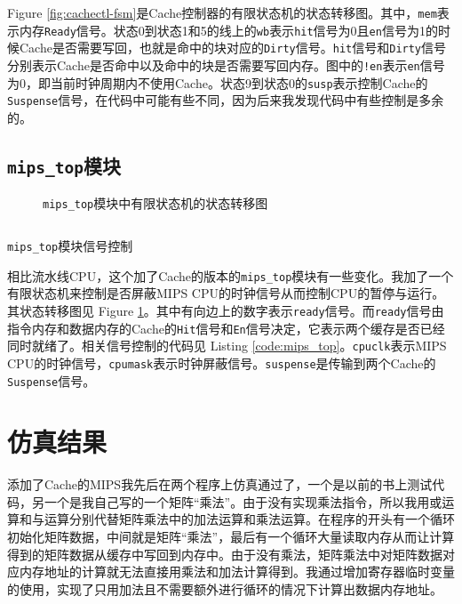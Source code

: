 \documentclass[12pt,a4paper]{article}
\newcommand{\incode}[1]{\texttt{#1}} %
\newcommand{\codefile}[1]{\inputminted[bgcolor=bg,linenos,tabsize=4]{verilog}{code/#1}} %
\begin{document}
Figure \ref{fig:cachectl-fsm}是Cache控制器的有限状态机的状态转移图。其中，\incode{mem}表示内存\incode{Ready}信号。状态0到状态1和5的线上的\incode{wb}表示\incode{hit}信号为0且\incode{en}信号为1的时候Cache是否需要写回，也就是命中的块对应的\incode{Dirty}信号。\incode{hit}信号和\incode{Dirty}信号分别表示Cache是否命中以及命中的块是否需要写回内存。图中的\incode{!en}表示\incode{en}信号为0，即当前时钟周期内不使用Cache。状态9到状态0的\incode{susp}表示控制Cache的\incode{Suspense}信号，在代码中可能有些不同，因为后来我发现代码中有些控制是多余的。

\subsection{\incode{mips_top}模块}

\begin{figure}[htb]
	\centering
	\caption{\incode{mips_top}模块中有限状态机的状态转移图}
	\label{fig:cpu-fsm}
\end{figure}

\begin{listing}[htb]
	\codefile{mips_top.v}
	\caption{\incode{mips_top}模块信号控制}
	\label{code:mips_top}
\end{listing}

相比流水线CPU，这个加了Cache的版本的\incode{mips_top}模块有一些变化。我加了一个有限状态机来控制是否屏蔽MIPS CPU的时钟信号从而控制CPU的暂停与运行。其状态转移图见 Figure \ref{fig:cpu-fsm}。其中有向边上的数字表示\incode{ready}信号。而\incode{ready}信号由指令内存和数据内存的Cache的\incode{Hit}信号和\incode{En}信号决定，它表示两个缓存是否已经同时就绪了。相关信号控制的代码见 Listing \ref{code:mips_top}。\incode{cpuclk}表示MIPS CPU的时钟信号，\incode{cpumask}表示时钟屏蔽信号。\incode{suspense}是传输到两个Cache的\incode{Suspense}信号。

\section{仿真结果}

添加了Cache的MIPS我先后在两个程序上仿真通过了，一个是以前的书上测试代码，另一个是我自己写的一个矩阵“乘法”。由于没有实现乘法指令，所以我用或运算和与运算分别代替矩阵乘法中的加法运算和乘法运算。在程序的开头有一个循环初始化矩阵数据，中间就是矩阵“乘法”，最后有一个循环大量读取内存从而让计算得到的矩阵数据从缓存中写回到内存中。由于没有乘法，矩阵乘法中对矩阵数据对应内存地址的计算就无法直接用乘法和加法计算得到。我通过增加寄存器临时变量的使用，实现了只用加法且不需要额外进行循环的情况下计算出数据内存地址。
\end{document}
